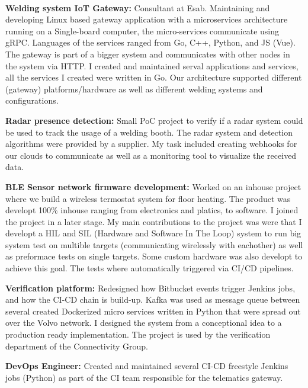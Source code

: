 
 \\
\SmallSep
\textbf{Welding system IoT Gateway:} Consultant at Esab. Maintaining and developing Linux based gateway application with a microservices architecture running on a Single-board computer, the micro-services communicate using gRPC. Languages of the services ranged from Go, C++, Python, and JS (Vue). The gateway is part of a bigger system and communicates with other nodes in the system via HTTP. I created and maintained serval applications and services, all the services I created were written in Go. Our architecture supported different (gateway) platforms/hardware as well as different welding systems and configurations.
\SmallSep 

\textbf{Radar presence detection:} Small PoC project to verify if a radar system could be used to track the usage of a welding booth. The radar system and detection algorithms were provided by a supplier. My task included creating webhooks for our clouds to communicate as well as a monitoring tool to visualize the received data. 
\SmallSep

\textbf{BLE Sensor network firmware development:} Worked on an inhouse project where we build a wireless termostat system for floor heating. The product was developt 100\% inhouse ranging from electronics and platics, to software. I joined the project in a later stage. My main contributions to the project was were that I developt a HIL and SIL (Hardware and Software In The Loop) system to run big system test on multible targets (communicating wirelessly with eachother) as well as preformace tests on single targets. Some custom hardware was also developt to achieve this goal. The tests where automatically triggered via CI/CD pipelines. \\
\Sep


\SmallSep
\textbf{Verification platform:} Redesigned how Bitbucket events trigger Jenkins jobs, and how the CI-CD chain is build-up. Kafka was used as message queue between several created Dockerized micro services written in Python that were spread out over the Volvo network. I designed the system from a conceptional idea to a production ready implementation. The project is used by the verification department of the Connectivity Group.
\SmallSep

\textbf{DevOps Engineer:} Created and maintained several CI-CD freestyle Jenkins jobs (Python) as part of the CI team responsible for the telematics gateway.
\SmallSep

